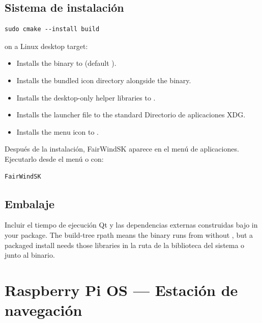 \subsection{Sistema de instalación}

\begin{lstlisting}
sudo cmake --install build
\end{lstlisting}

 on a Linux desktop target:

\begin{itemize}
  \item Installs the  binary to
         (default ).
  \item Installs the bundled icon directory alongside the binary.
  \item Installs the desktop-only helper libraries to
        .
  \item Installs the  launcher file to the standard
Directorio de aplicaciones XDG.
  \item Installs the  menu icon to
        .
\end{itemize}

Después de la instalación, FairWindSK aparece en el menú de aplicaciones.
Ejecutarlo desde el menú o con:

\begin{lstlisting}
FairWindSK
\end{lstlisting}

\subsection{Embalaje}

Incluir el tiempo de ejecución Qt y las dependencias externas construidas bajo
 in your package.
The build-tree rpath means the binary runs from  without
, but a packaged install needs those libraries in
la ruta de la biblioteca del sistema o junto al binario.

\section{Raspberry Pi OS --- Estación de navegación}
\label{app:rpi-station}

